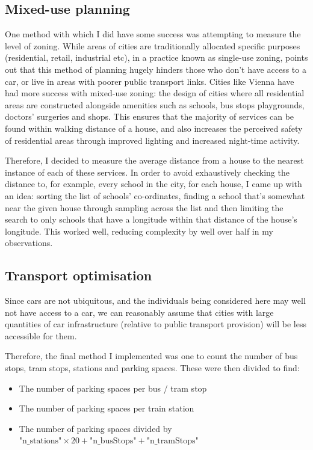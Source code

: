 \documentclass[12pt]{article} %
\begin{document}
\subsection{Mixed-use planning}
One method with which I did have some success was attempting to measure the level of zoning. While areas of cities are traditionally allocated specific purposes (residential, retail, industrial etc), in a practice known as single-use zoning, \cite{Perez2019} points out that this method of planning hugely hinders those who don't have access to a car, or live in areas with poorer public transport links. Cities like Vienna have had more success with mixed-use zoning: the design of cities where all residential areas are constructed alongside amenities such as schools, bus stops playgrounds, doctors' surgeries and shops. This ensures that the majority of services can be found within walking distance of a house, and also increases the perceived safety of residential areas through improved lighting and increased night-time activity.

Therefore, I decided to measure the average distance from a house to the nearest instance of each of these services. In order to avoid exhaustively checking the distance to, for example, every school in the city, for each house, I came up with an idea: sorting the list of schools' co-ordinates, finding a school that's somewhat near the given house through sampling across the list and then limiting the search to only schools that have a longitude within that distance of the house's longitude. This worked well, reducing complexity by well over half in my observations.

\subsection{Transport optimisation}
Since cars are not ubiquitous, and the individuals being considered here may well not have access to a car, we can reasonably assume that cities with large quantities of car infrastructure (relative to public transport provision) will be less accessible for them.

Therefore, the final method I implemented was one to count the number of bus stops, tram stops, stations and parking spaces. These were then divided to find:

\begin{itemize}
	\item The number of parking spaces per bus / tram stop
	\item The number of parking spaces per train station
	\item The number of parking spaces divided by $\text{"n\_stations"}\times 20 + \text{"n\_busStops"} + \text{"n\_tramStops"}$
\end{itemize}
\end{document}
